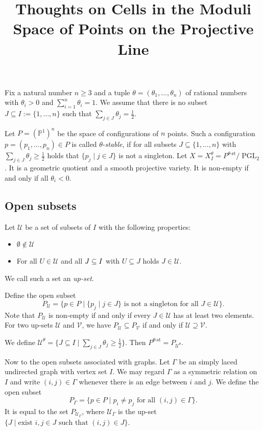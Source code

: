 \documentclass[11pt, a4paper]{amsart}
\title{Thoughts on Cells in the Moduli Space of Points on the Projective Line}
\author{}
\date{}
\begin{document}
	\maketitle
	
	Fix a natural number $n \geq 3$ and a tuple $\theta = (\theta_1,\ldots,\theta_n)$ of rational numbers with $\theta_i > 0$ and $\sum_{i=1}^n \theta_i = 1$. 
	We assume that there is no subset $J \subseteq I := \{1,\ldots,n\}$ such that $\sum_{j \in J} \theta_j = \frac{1}{2}$.

	Let $P = (\mathbb{P}^1)^n$ be the space of configurations of $n$ points. 
	Such a configuration $p = (p_1,\ldots,p_n) \in P$ is called $\theta$-\emph{stable}, if for all subsets $J \subseteq \{1,\ldots,n\}$ with $\sum_{j \in J} \theta_j \geq \frac{1}{2}$ holds that $\{p_j \mid j \in J\}$ is not a singleton.
	Let $X = X_I^\theta = P^{\theta\text{-st}}/\operatorname{PGL}_2$. It is a geometric quotient and a smooth projective variety. 
	It is non-empty if and only if all $\theta_i < 0$.

	\subsection*{Open subsets}
	Let $\mathcal{U}$ be a set of subsets of $I$ with the following properties:
	\begin{itemize}
		\item $\emptyset \notin \mathcal{U}$
		\item For all $U \in \mathcal{U}$ and all $J \subseteq I$ with $U \subseteq J$ holds $J \in \mathcal{U}$.
	\end{itemize}
	We call such a set an \emph{up-set}.

	Define the open subset 
	\[ 
		P_\mathcal{U} = \{p \in P \mid \{p_j \mid j \in J\} \text{ is not a singleton for all } J \in \mathcal{U} \}.
	\]
	Note that $P_{\mathcal{U}}$ is non-empty if and only if every $J \in \mathcal{U}$ has at least two elements. 
	For two up-sets $\mathcal{U}$ and $\mathcal{V}$, we have $P_{\mathcal{U}} \subseteq P_{\mathcal{V}}$ if and only if $\mathcal{U} \supseteq \mathcal{V}$.

	We define $\mathcal{U}^\theta = \{J \subseteq I \mid \sum_{j \in J} \theta_j \geq \frac{1}{2} \}$. Then $P^{\theta\text{-st}} = P_{\mathcal{U}^\theta}$.

	Now to the open subsets associated with graphs. Let $\Gamma$ be an simply laced undirected graph with vertex set $I$. 
	We may regard $\Gamma$ as a symmetric relation on $I$ and write $(i,j) \in \Gamma$ whenever there is an edge between $i$ and $j$. We define the open subset 
	\[
		P_\Gamma = \{p \in P \mid p_i \neq p_j \text{ for all } (i,j) \in \Gamma \}.
	\]
	It is equal to the set $P_{\mathcal{U}_\Gamma}$, where $\mathcal{U}_\Gamma$ is the up-set $\{J \mid \text{exist } i,j \in J \text{ such that } (i,j) \in J\}$.
\end{document}
